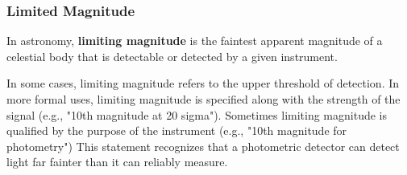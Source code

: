 \documentclass{article}
\begin{document}
\subsubsection{Limited Magnitude}
In astronomy, \textbf{limiting magnitude} is the faintest apparent magnitude of a celestial body that is detectable or detected by a given instrument.\par
In some cases, limiting magnitude refers to the upper threshold of detection. In more formal uses, limiting magnitude is specified along with the strength of the signal (e.g., "10th magnitude at 20 sigma"). Sometimes limiting magnitude is qualified by the purpose of the instrument (e.g., "10th magnitude for photometry") This statement recognizes that a photometric detector can detect light far fainter than it can reliably measure.
\end{document}
